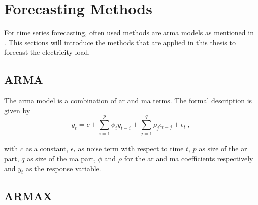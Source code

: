 \section{Forecasting Methods}
\label{sec:forecastmet}

For time series forecasting, often used methods are \eg \gls{arma} models as mentioned in . This sections will introduce the methods that are applied in this thesis to forecast the electricity load.\\%

\subsection*{ARMA}

The \gls{arma} model is a combination of \acrfull{ar} and \gls{ma} terms. The formal description is given by\\

\begin{equation}
y_t = c+\sum_{i=1}^{p}\phi_iy_{t-i}+\sum_{j=1}^{q}\rho_j\epsilon_{t-j}+\epsilon_t~,
\label{eq:arma}
\end{equation}

with $c$ as a constant, $\epsilon_t$ as noise term with respect to time $t$, $p$ as size of the \gls{ar} part, $q$ as size of the \gls{ma} part, $\phi$ and $\rho$ for the \gls{ar} and \gls{ma} coefficients respectively and $y_t$ as the response variable.\\

\subsection*{ARMAX}

